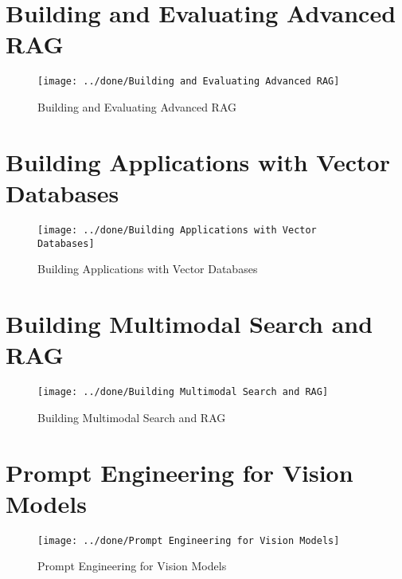 \documentclass[a4paper,12pt]{article}
\begin{document}
\section*{Building and Evaluating Advanced RAG}
\begin{figure}[h]
	\centering
	\vspace{-10pt} %
	\texttt{[image: ../done/Building and Evaluating Advanced RAG]}
	\vspace{-10pt} %
	\caption{Building and Evaluating Advanced RAG}
	\vspace{-10pt} %
\end{figure}


\section*{Building Applications with Vector Databases}
\begin{figure}[h]
	\centering
	\vspace{-10pt} %
	\texttt{[image: ../done/Building Applications with Vector Databases]}
	\vspace{-10pt} %
	\caption{Building Applications with Vector Databases}
	\vspace{-10pt} %
\end{figure}
\newpage
\section*{Building Multimodal Search and RAG}
\begin{figure}[h]
	\centering
	\vspace{-10pt} %
	\texttt{[image: ../done/Building Multimodal Search and RAG]}
	\vspace{-10pt} %
	\caption{Building Multimodal Search and RAG}
	\vspace{-10pt} %
\end{figure}


\section*{Prompt Engineering for Vision Models}
\begin{figure}[h]
	\centering
	\vspace{-10pt} %
	\texttt{[image: ../done/Prompt Engineering for Vision Models]}
	\vspace{-10pt} %
	\caption{Prompt Engineering for Vision Models}
	\vspace{-10pt} %
\end{figure}
\newpage
\end{document}
